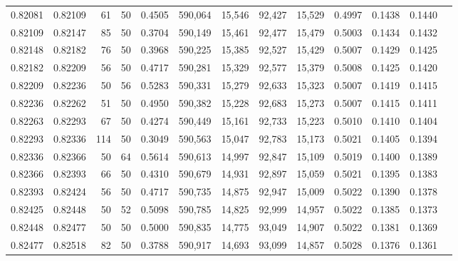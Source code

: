 \begin{tabular}{rrrrrrrrrrrrr}
0.82081 & 0.82109 &    61 &  50 &                                     0.4505 & 590,064 &  15,546 &  92,427 &  15,529 & 0.4997 & 0.1438 & 0.1440 \\
0.82109 & 0.82147 &    85 &  50 &                                     0.3704 & 590,149 &  15,461 &  92,477 &  15,479 & 0.5003 & 0.1434 & 0.1432 \\
0.82148 & 0.82182 &    76 &  50 &                                     0.3968 & 590,225 &  15,385 &  92,527 &  15,429 & 0.5007 & 0.1429 & 0.1425 \\
0.82182 & 0.82209 &    56 &  50 &                                     0.4717 & 590,281 &  15,329 &  92,577 &  15,379 & 0.5008 & 0.1425 & 0.1420 \\
0.82209 & 0.82236 &    50 &  56 &                                     0.5283 & 590,331 &  15,279 &  92,633 &  15,323 & 0.5007 & 0.1419 & 0.1415 \\
0.82236 & 0.82262 &    51 &  50 &                                     0.4950 & 590,382 &  15,228 &  92,683 &  15,273 & 0.5007 & 0.1415 & 0.1411 \\
0.82263 & 0.82293 &    67 &  50 &                                     0.4274 & 590,449 &  15,161 &  92,733 &  15,223 & 0.5010 & 0.1410 & 0.1404 \\
0.82293 & 0.82336 &   114 &  50 &                                     0.3049 & 590,563 &  15,047 &  92,783 &  15,173 & 0.5021 & 0.1405 & 0.1394 \\
0.82336 & 0.82366 &    50 &  64 &                                     0.5614 & 590,613 &  14,997 &  92,847 &  15,109 & 0.5019 & 0.1400 & 0.1389 \\
0.82366 & 0.82393 &    66 &  50 &                                     0.4310 & 590,679 &  14,931 &  92,897 &  15,059 & 0.5021 & 0.1395 & 0.1383 \\
0.82393 & 0.82424 &    56 &  50 &                                     0.4717 & 590,735 &  14,875 &  92,947 &  15,009 & 0.5022 & 0.1390 & 0.1378 \\
0.82425 & 0.82448 &    50 &  52 &                                     0.5098 & 590,785 &  14,825 &  92,999 &  14,957 & 0.5022 & 0.1385 & 0.1373 \\
0.82448 & 0.82477 &    50 &  50 &                                     0.5000 & 590,835 &  14,775 &  93,049 &  14,907 & 0.5022 & 0.1381 & 0.1369 \\
0.82477 & 0.82518 &    82 &  50 &                                     0.3788 & 590,917 &  14,693 &  93,099 &  14,857 & 0.5028 & 0.1376 & 0.1361 \\

\end{tabular}
